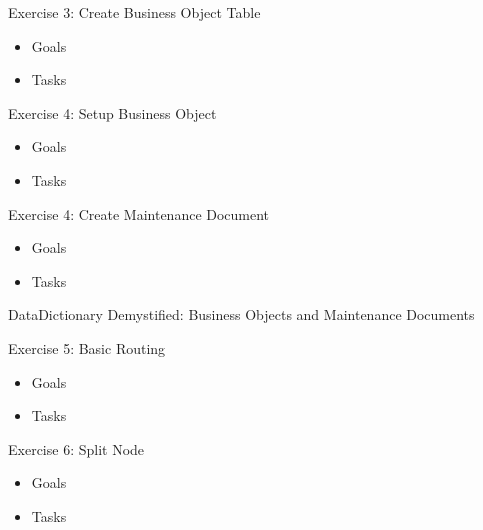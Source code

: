 \documentclass[xcolor=dvipsnames,14pt]{beamer}
\begin{document}
\begin{frame}{Exercise 3: Create Business Object Table}
	\begin{itemize}
		\item Goals
		\item Tasks
	\end{itemize}
\end{frame}

\begin{frame}{Exercise 4: Setup Business Object}
	\begin{itemize}
		\item Goals
		\item Tasks
	\end{itemize}
\end{frame}

\begin{frame}{Exercise 4: Create Maintenance Document}
	\begin{itemize}
		\item Goals
		\item Tasks
	\end{itemize}
\end{frame}

\begin{frame}{DataDictionary Demystified: Business Objects and Maintenance Documents}
\end{frame}

\begin{frame}{Exercise 5: Basic Routing}
	\begin{itemize}
		\item Goals
		\item Tasks
	\end{itemize}
\end{frame}

\begin{frame}{Exercise 6: Split Node}
	\begin{itemize}
		\item Goals
		\item Tasks
	\end{itemize}
\end{frame}
\end{document}

